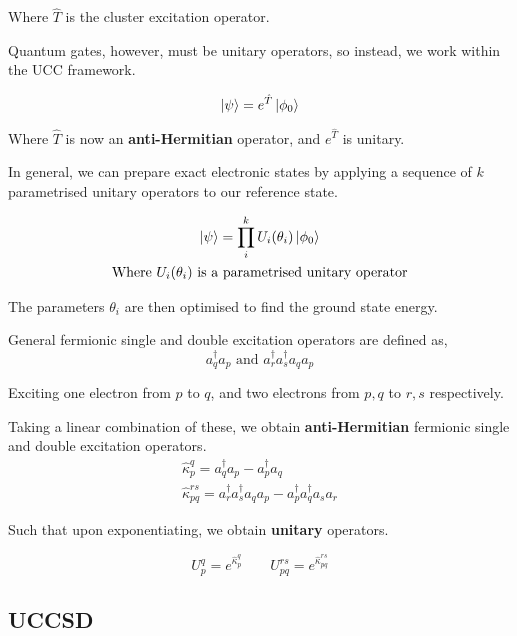 Where $\hat T$ is the cluster excitation operator.

Quantum gates, however, must be unitary operators, so instead, we work within the UCC framework.

\begin{equation*}
    \ket\psi = e^{\hat T} \ket{\phi_0}
\end{equation*}

Where $\hat T$ is now an \textbf{anti-Hermitian} operator, and $e^{\hat T}$ is unitary.

In general, we can prepare exact electronic states by applying a sequence of $k$ parametrised unitary operators to our reference state.

\begin{equation*}
\begin{gathered}
    \ket\psi = \prod_i^k U_i(\theta_i) \ket{\phi_0} \\
    \text{Where $U_i(\theta_i)$ is a parametrised unitary operator}
\end{gathered}
\end{equation*}\smallskip

The parameters $\theta_i$ are then optimised to find the ground state energy.

General fermionic single and double excitation operators are defined as,
\begin{equation*}
    a_q^\dagger a_p \text{ and } a_r^\dagger a_s^\dagger a_q a_p
\end{equation*}

Exciting one electron from $p$ to $q$, and two electrons from $p, q$ to $r, s$ respectively.

Taking a linear combination of these, we obtain \textbf{anti-Hermitian} fermionic single and double excitation operators.
\begin{equation*}
\begin{gathered}
    \hat\kappa_p^q = a_q^\dagger a_p - a_p^\dagger a_q \\
    \hat\kappa_{pq}^{rs} =
    a_r^\dagger a_s^\dagger a_q a_p - a_p^\dagger a_q^\dagger a_s a_r
\end{gathered}
\end{equation*}\smallskip

Such that upon exponentiating, we obtain \textbf{unitary} operators.

\begin{equation*}
    U^q_p = e^{\hat\kappa_p^q} \qquad
    U_{pq}^{rs} = e^{\hat\kappa_{pq}^{rs}}
\end{equation*}

\subsection{UCCSD}
